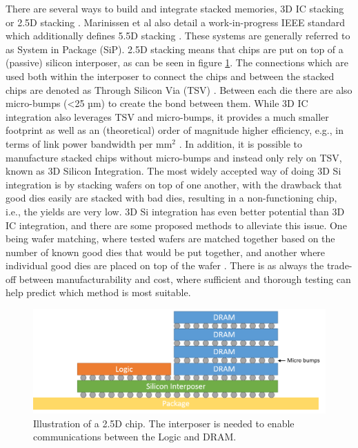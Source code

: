 There are several ways to build and integrate stacked memories, 3D IC stacking or 2.5D stacking \cite{6248905}\cite{5702702}\cite{6248842}. Marinissen et al also detail a work-in-progress IEEE standard which additionally defines 5.5D stacking \cite{7519330}. These systems are generally referred to as System in Package (SiP). 2.5D stacking means that chips are put on top of a (passive) silicon interposer, as can be seen in figure \ref{2D-chip}. The connections which are used both within the interposer to connect the chips and between the stacked chips are denoted as Through Silicon Via (TSV) \cite{Lau2018}\cite{lau2012through}. Between each die there are also micro-bumps (<25 µm) to create the bond between them. While 3D IC integration also leverages TSV and micro-bumps, it provides a much smaller footprint as well as an (theoretical) order of magnitude higher efficiency, e.g., in terms of link power bandwidth per mm$^{2}$ \cite{6248968}. In addition, it is possible to manufacture stacked chips without micro-bumps and instead only rely on TSV, known as 3D Silicon Integration. The most widely accepted way of doing 3D Si integration is by stacking wafers on top of one another, with the drawback that good dies easily are stacked with bad dies, resulting in a non-functioning chip, i.e., the yields are very low. 3D Si integration has even better potential than 3D IC integration, and there are some proposed methods to alleviate this issue. One being wafer matching, where tested wafers are matched together based on the number of known good dies that would be put together, and another where individual good dies are placed on top of the wafer \cite{Taouil:2010:TCA:1931472.1931973}. There is as always the trade-off between manufacturability and cost, where sufficient and thorough testing can help predict which method is most suitable.

\begin{figure}[!h]
\centering
\includegraphics[width=0.75\linewidth]{figure/2D-integration.png}
\caption{Illustration of a 2.5D chip. The interposer is needed to enable communications between the Logic and DRAM. }
\label{2D-chip}
\end{figure}

